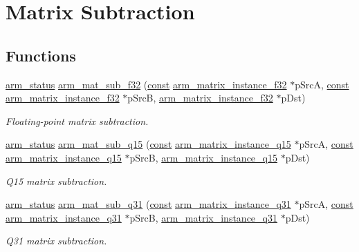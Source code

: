 \hypertarget{group___matrix_sub}{\section{Matrix Subtraction}
\label{group___matrix_sub}
}
\subsection*{Functions}
\begin{DoxyCompactItemize}
\item 
\hyperlink{arm__math_8h_a5e459c6409dfcd2927bb8a57491d7cf6}{arm\-\_\-status} \hyperlink{group___matrix_sub_gac8b72fb70246ccfee3b372002345732c}{arm\-\_\-mat\-\_\-sub\-\_\-f32} (\hyperlink{group___n_a_m_e_ga7ae6d0e43244213b34de2c2b9aa30da6}{const} \hyperlink{structarm__matrix__instance__f32}{arm\-\_\-matrix\-\_\-instance\-\_\-f32} $\ast$p\-Src\-A, \hyperlink{group___n_a_m_e_ga7ae6d0e43244213b34de2c2b9aa30da6}{const} \hyperlink{structarm__matrix__instance__f32}{arm\-\_\-matrix\-\_\-instance\-\_\-f32} $\ast$p\-Src\-B, \hyperlink{structarm__matrix__instance__f32}{arm\-\_\-matrix\-\_\-instance\-\_\-f32} $\ast$p\-Dst)
\begin{DoxyCompactList}\small\item\em Floating-\/point matrix subtraction. \end{DoxyCompactList}\item 
\hyperlink{arm__math_8h_a5e459c6409dfcd2927bb8a57491d7cf6}{arm\-\_\-status} \hyperlink{group___matrix_sub_gaf647776a425b7f9dd0aca3e11d81f02f}{arm\-\_\-mat\-\_\-sub\-\_\-q15} (\hyperlink{group___n_a_m_e_ga7ae6d0e43244213b34de2c2b9aa30da6}{const} \hyperlink{structarm__matrix__instance__q15}{arm\-\_\-matrix\-\_\-instance\-\_\-q15} $\ast$p\-Src\-A, \hyperlink{group___n_a_m_e_ga7ae6d0e43244213b34de2c2b9aa30da6}{const} \hyperlink{structarm__matrix__instance__q15}{arm\-\_\-matrix\-\_\-instance\-\_\-q15} $\ast$p\-Src\-B, \hyperlink{structarm__matrix__instance__q15}{arm\-\_\-matrix\-\_\-instance\-\_\-q15} $\ast$p\-Dst)
\begin{DoxyCompactList}\small\item\em Q15 matrix subtraction. \end{DoxyCompactList}\item 
\hyperlink{arm__math_8h_a5e459c6409dfcd2927bb8a57491d7cf6}{arm\-\_\-status} \hyperlink{group___matrix_sub_ga39f42e0e3b7f115fbb909d6ff4e1329d}{arm\-\_\-mat\-\_\-sub\-\_\-q31} (\hyperlink{group___n_a_m_e_ga7ae6d0e43244213b34de2c2b9aa30da6}{const} \hyperlink{structarm__matrix__instance__q31}{arm\-\_\-matrix\-\_\-instance\-\_\-q31} $\ast$p\-Src\-A, \hyperlink{group___n_a_m_e_ga7ae6d0e43244213b34de2c2b9aa30da6}{const} \hyperlink{structarm__matrix__instance__q31}{arm\-\_\-matrix\-\_\-instance\-\_\-q31} $\ast$p\-Src\-B, \hyperlink{structarm__matrix__instance__q31}{arm\-\_\-matrix\-\_\-instance\-\_\-q31} $\ast$p\-Dst)
\begin{DoxyCompactList}\small\item\em Q31 matrix subtraction. \end{DoxyCompactList}\end{DoxyCompactItemize}


